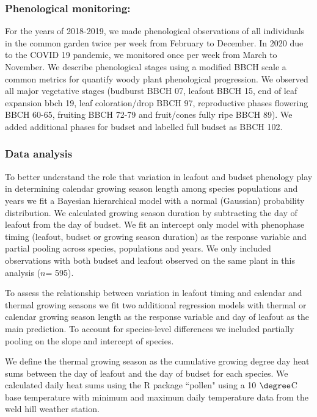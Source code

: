 \documentclass{article}[12pt]
\begin{document}
{\subsubsection{Phenological monitoring:}
For the years of 2018-2019, we made phenological observations of all individuals in the common garden twice per week from February to December. In 2020 due to the COVID 19 pandemic, we monitored once per week from March to November. We describe phenological stages using a modified BBCH scale \citep{Finn2007} a common metrics for quantify woody plant phenological progression. We observed all major vegetative stages (budburst BBCH 07, leafout BBCH 15, end of leaf expansion bbch 19, leaf coloration/drop BBCH 97, reproductive phases flowering BBCH 60-65, fruiting BBCH 72-79 and fruit/cones fully ripe BBCH 89). We added additional phases for budset and labelled full budset as BBCH 102. 

\subsubsection{Data analysis}
To better understand the role that variation in leafout and budset phenology play in determining calendar growing season length among species populations and years we fit a Bayesian hierarchical model with a normal (Gaussian) probability distribution. We calculated growing season duration by subtracting the day of leafout from the day of budset. We fit an intercept only model with phenophase timing (leafout, budset or growing season duration) as the response variable and partial pooling across species, populations and years. We only included observations with both budset and leafout observed on the same plant in this analysis ($n$= 595).

To assess the relationship between variation in leafout timing and calendar and thermal growing seasons we fit two additional regression models with thermal or calendar growing season length as the response variable and day of leafout as the main prediction. To account for species-level differences we included partially pooling on the slope and intercept of species.

We define the thermal growing season as the cumulative growing degree day heat sums between the day of leafout and the day of budset for each species. We calculated daily heat sums using the R package ``pollen" \citep{Nowosad2019} using a 10 $\degree$C base temperature with minimum and maximum daily temperature data from the weld hill weather station.

}
\end{document}
